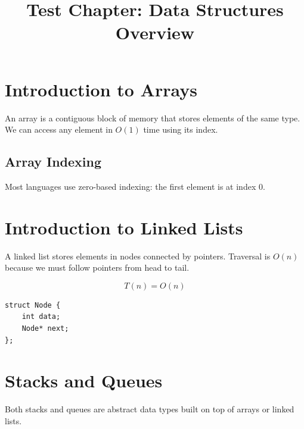 \documentclass{article}
\title{Test Chapter: Data Structures Overview}
\begin{document}
\maketitle

\section{Introduction to Arrays}
An array is a contiguous block of memory that stores elements of the same type.
We can access any element in $O(1)$ time using its index.

\subsection{Array Indexing}
Most languages use zero-based indexing: the first element is at index 0.

\section{Introduction to Linked Lists}
A linked list stores elements in nodes connected by pointers.
Traversal is $O(n)$ because we must follow pointers from head to tail.

\begin{equation}
T(n) = O(n)
\end{equation}

\begin{verbatim}
struct Node {
    int data;
    Node* next;
};
\end{verbatim}

\section{Stacks and Queues}
Both stacks and queues are abstract data types built on top of arrays or linked lists.
\end{document}

